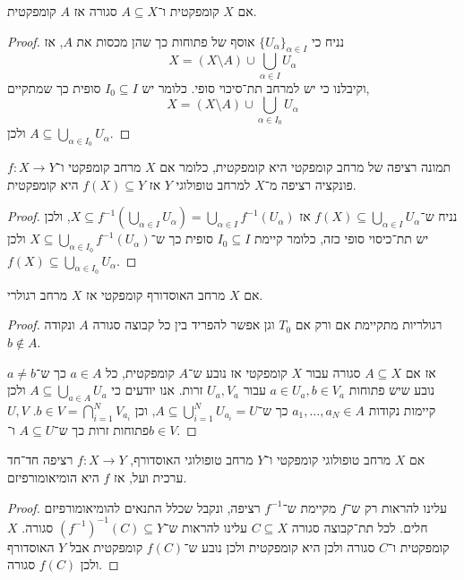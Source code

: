 \begin{proposition}
	אם $X$ קומפקטית ו־$A \subseteq X$ סגורה אז $A$ קומפקטית.
\end{proposition}
\begin{proof}
	נניח כי ${\{ U_{\alpha} \}}_{\alpha \in I}$ אוסף של פתוחות כך שהן מכסות את $A$, אז
	\[
		X = (X \setminus A) \cup \bigcup_{\alpha \in I} U_{\alpha}
	\]
	וקיבלנו כי יש למרחב תת־סיכוי סופי.
	כלומר יש $I_{0} \subseteq I$ סופית כך שמתקיים,
	\[
		X = (X \setminus A) \cup \bigcup_{\alpha \in I_{0}} U_{\alpha}
	\]
	ולכן $A \subseteq \bigcup_{\alpha \in I_{0}} U_{\alpha}$.
\end{proof}
\begin{proposition}
	תמונה רציפה של מרחב קומפקטי היא קומפקטית,
	כלומר אם $X$ מרחב קומפקטי ו־$f : X \to Y$ פונקציה רציפה מ־$X$ למרחב טופולוגי $Y$ אז $f(X) \subseteq Y$ היא קומפקטית.
\end{proposition}
\begin{proof}
	נניח ש־$f(X) \subseteq \bigcup_{\alpha \in I} U_{\alpha}$ אז $X \subseteq f^{-1}( \bigcup_{\alpha \in I} U_{\alpha}) = \bigcup_{\alpha \in I} f^{-1}(U_{\alpha})$,
	ולכן יש תת־כיסוי סופי כזה, כלומר קיימת $I_{0} \subseteq I$ סופית כך ש־$X \subseteq \bigcup_{\alpha \in I_{0}} f^{-1}(U_{\alpha})$ ולכן $f(X) \subseteq \bigcup_{\alpha \in I_{0}} U_{\alpha}$.
\end{proof}
\begin{proposition}
	אם $X$ מרחב האוסדורף קומפקטי אז $X$ מרחב רגולרי.
\end{proposition}
\begin{proof}
	רגולריות מתקיימת אם ורק אם $T_0$ וגן אפשר להפריד בין כל קבוצה סגורה $A$ ונקודה $b \notin A$.

	אז אם $A \subseteq X$ סגורה עבור $X$ קומפקטי אז נובע ש־$A$ קומפקטית, כל $a \in A$ כך ש־$a \ne b$ נובע שיש פתוחות $a \in U_a, b \in V_a$ עבור $U_a, V_a$ זרות.
	אנו יודעים כי $A \subseteq \bigcup_{a \in A} U_a$ ולכן קיימות נקודות $a_1, \ldots, a_N \in A$ כך ש־$A  \subseteq \bigcup_{i = 1}^N U_{a_i} = U$,
	וכן $b \in V = \bigcap_{i = 1}^N V_{a_i}$.
	$U, V$ פתוחות זרות כך ש־$A \subseteq U$ ו־$b \in V$.
\end{proof}
\begin{conclusion}
	אם $X$ מרחב טופולוגי קומפקטי ו־$Y$ מרחב טופולוגי האוסדורף, $f : X \to Y$ רציפה חד־חד ערכית ועל, אז $f$ היא הומיאומורפיזם.
\end{conclusion}
\begin{proof}
	עלינו להראות רק ש־$f$ מקיימת ש־$f^{-1}$ רציפה, ונקבל שכלל התנאים להומיאומורפיזם חלים.
	לכל תת־קבוצה סגורה $C \subseteq X$ עלינו להראות ש־${(f^{-1})}^{-1}(C) \subseteq Y$ סגורה.
	$X$ קומפקטית ו־$C$ סגורה ולכן היא קומפקטית ולכן נובע ש־$f(C)$ קומפקטית אבל $Y$ האוסדורף ולכן $f(C)$ סגורה.
\end{proof}
